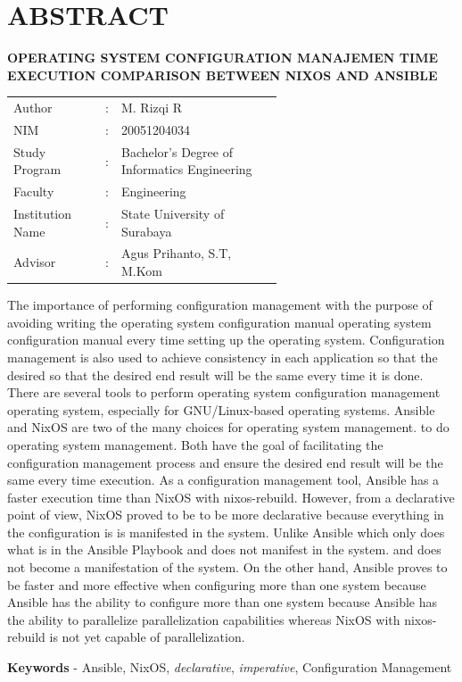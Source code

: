 \documentclass[10pt,twoside]{report}
\begin{document}
\chapter*{ABSTRACT}
\begin{adjustwidth}{0.0cm}{}
	\begin{center}
		\textbf{OPERATING SYSTEM CONFIGURATION MANAJEMEN TIME EXECUTION COMPARISON BETWEEN NIXOS AND ANSIBLE}
	\end{center}
	\medskip
	\begin{adjustwidth}{0.0cm}{}
		\begin{tabular}{@{}lcp{0.6\linewidth}}
			Author           & : & M. Rizqi R                                   \\
			NIM              & : & 20051204034                                  \\
			Study Program    & : & Bachelor's Degree of Informatics Engineering \\
			Faculty          & : & Engineering                                  \\
			Institution Name & : & State University of Surabaya                 \\
			Advisor          & : & Agus Prihanto, S.T, M.Kom                    \\
		\end{tabular}
	\end{adjustwidth}
	\medskip

	The importance of performing configuration management with the purpose of
	avoiding writing the operating system configuration manual operating system
	configuration manual every time setting up the operating system.
	Configuration management is also used to achieve consistency in each
	application so that the desired so that the desired end result will be the
	same every time it is done. There are several tools to perform operating
	system configuration management operating system, especially for
	GNU/Linux-based operating systems. Ansible and NixOS are two of the many
	choices for operating system management. to do operating system management.
	Both have the goal of facilitating the configuration management process and
	ensure the desired end result will be the same every time execution. As a
	configuration management tool, Ansible has a faster execution time than NixOS
	with nixos-rebuild. However, from a declarative point of view, NixOS proved
	to be to be more declarative because everything in the configuration is is
	manifested in the system. Unlike Ansible which only does what is in the
	Ansible Playbook and does not manifest in the system. and does not become a
	manifestation of the system. On the other hand, Ansible proves to be faster
	and more effective when configuring more than one system because Ansible has
	the ability to configure more than one system because Ansible has the ability
	to parallelize parallelization capabilities whereas NixOS with nixos-rebuild
	is not yet capable of parallelization.

	\medskip

	\noindent\textbf{Keywords} - Ansible, NixOS, \textit{declarative}, \textit{imperative},
	Configuration Management
\end{adjustwidth}
\end{document}
